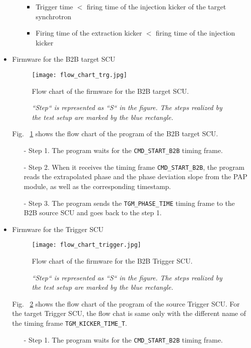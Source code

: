\begin{itemize}
\begin{itemize}
\begin{itemize}
	\item Trigger time $<$ firing time of the injection kicker of the target synchrotron

	\item Firing time of the extraction kicker $<$ firing time of the injection kicker
\end{itemize}
 

	\end{itemize}
\item Firmware for the B2B target SCU
\begin{figure}[H]
   \centering   
   \texttt{[image: flow\_chart\_trg.jpg]}
   \caption{Flow chart of the firmware for the B2B target SCU.}
	\caption*{\textsl{\small{``Step`` is represented as ``S`` in the figure. The steps realized by the test setup are marked by the blue rectangle.}}}
   \label{flow_chart_trg}
\end{figure}
Fig. ~\ref{flow_chart_trg} shows the flow chart of the program of the B2B target SCU.
 	\begin{itemize}
		\item[-]Step 1. The program waits for the \verb|CMD_START_B2B| timing frame.
 		\item[-]Step 2. When it receives the timing frame \verb|CMD_START_B2B|, the program reads the extrapolated phase and the phase deviation slope from the PAP module, as well as the corresponding timestamp.
		\item[-]Step 3. The program sends the \verb|TGM_PHASE_TIME| timing frame to the B2B source SCU and goes back to the step 1.
	\end{itemize}
\item Firmware for the Trigger SCU
\begin{figure}[H]
   \centering   
   \texttt{[image: flow\_chart\_trigger.jpg]}
   \caption{Flow chart of the firmware for the B2B Trigger SCU.}
	\caption*{\textsl{\small{``Step`` is represented as ``S`` in the figure. The steps realized by the test setup are marked by the blue rectangle.}}}
   \label{flow_chart_trigger}
\end{figure}
Fig. ~\ref{flow_chart_trigger} shows the flow chart of the program of the source Trigger SCU. For the target Trigger SCU, the flow chat is same only with the different name of the timing frame \verb|TGM_KICKER_TIME_T|.
 	\begin{itemize}
		\item[-]Step 1. The program waits for the \verb|CMD_START_B2B| timing frame. 

\end{itemize}
\end{itemize}

